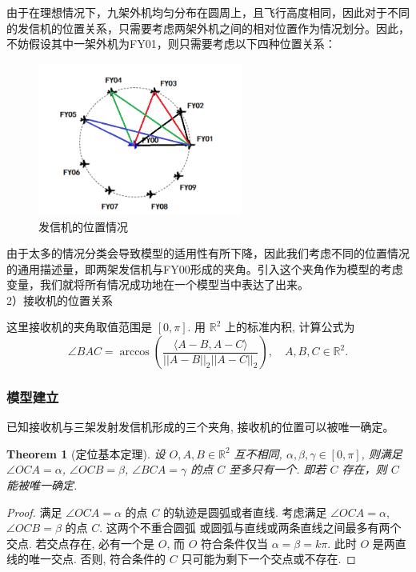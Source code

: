 \documentclass{my_paper}
\newcommand{\R}{\mathbb{R}}
\newtheorem{theorem}{Theorem}
\begin{document}
由于在理想情况下，九架外机均匀分布在圆周上，且飞行高度相同，因此对于不同的发信机的位置关系，只需要考虑两架外机之间的相对位置作为情况划分。因此，不妨假设其中一架外机为FY01，则只需要考虑以下四种位置关系：

\begin{figure}[H]
    \centering
    \includegraphics[width=0.6\textwidth]{pic1.png}
    \caption{发信机的位置情况} 
\end{figure}

由于太多的情况分类会导致模型的适用性有所下降，因此我们考虑不同的位置情况的通用描述量，即两架发信机与FY00形成的夹角。引入这个夹角作为模型的考虑变量，我们就将所有情况成功地在一个模型当中表达了出来。\\

2）接收机的位置关系

这里接收机的夹角取值范围是 $[0,\pi]$. 用 $\R^2$ 上的标准内积, 计算公式为
$$
    \angle BAC = \arccos (\frac{\langle A-B,A-C\rangle}{||A-B||_2||A-C||_2}),\quad A,B,C\in \R^2.
$$


\subsubsection{模型建立}

已知接收机与三架发射发信机形成的三个夹角, 接收机的位置可以被唯一确定。
\begin{theorem}[定位基本定理]
    设 $O,A,B\in\R^2$ 互不相同, $\alpha,\beta,\gamma\in[0,\pi]$, 则满足 $\angle OCA = \alpha$, $\angle OCB = \beta$, $\angle BCA = \gamma$ 的点 $C$ 
    至多只有一个. 即若 $C$ 存在，则 $C$ 能被唯一确定. 
\end{theorem}
\begin{proof}
    满足 $\angle OCA = \alpha$ 的点 $C$ 的轨迹是圆弧或者直线. 考虑满足 $\angle OCA = \alpha$, $\angle OCB = \beta$ 的点 $C$. 这两个不重合圆弧
    或圆弧与直线或两条直线之间最多有两个交点. 若交点存在, 必有一个是 $O$, 而 $O$ 符合条件仅当 $\alpha=\beta=k\pi$. 
    此时 $O$ 是两直线的唯一交点. 否则, 符合条件的 $C$ 只可能为剩下一个交点或不存在. 
\end{proof}
\end{document}
